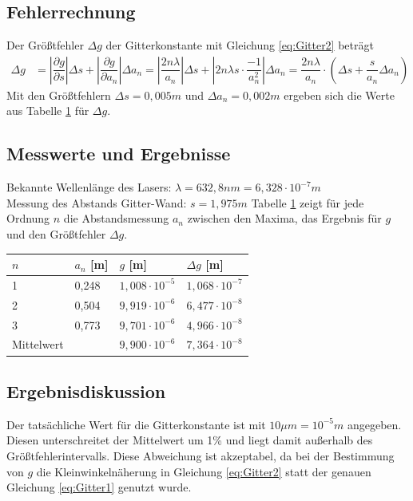 \documentclass{scrartcl}
\begin{document}
\subsection{Fehlerrechnung}
Der Größtfehler $\Delta g$ der Gitterkonstante mit Gleichung \ref{eq:Gitter2} beträgt
\begin{align*}
\Delta g & = \left| \dfrac{\partial g}{\partial s} \right| \Delta s + \left| \dfrac{\partial g}{\partial a_{n}} \right| \Delta a_{n} = \left| \dfrac{2n \lambda}{a_{n}} \right| \Delta s + \left| 2n \lambda s \cdot \dfrac{-1}{a_{n}^{2}} \right| \Delta a_{n} = \dfrac{2n \lambda}{a_{n}} \cdot \left( \Delta s + \dfrac{s}{a_{n}} \Delta a_{n} \right)
\end{align*}
Mit den Größtfehlern $\Delta s = 0,005m$ und $\Delta a_{n} = 0,002m$ ergeben sich  die Werte aus Tabelle \ref{tab:Gitter} für $\Delta g$.
\subsection{Messwerte und Ergebnisse}
Bekannte Wellenlänge des Lasers: $\lambda = 632,8nm = 6,328 \cdot 10^{-7}m$ \\
Messung des Abstands Gitter-Wand: $s = 1,975m$
Tabelle \ref{tab:Gitter} zeigt für jede Ordnung $n$ die Abstandsmessung $a_{n}$ zwischen den Maxima, das Ergebnis für $g$ und den Größtfehler $\Delta g$.
\begin{table}[H]
\begin{center}
\begin{tabular}{l|l|l|l}
$n$    & $a_{n}$ {[}m{]} & $g$ {[}m{]} & $\Delta g$ {[}m{]}\\
\hline
1          & 0,248       & $1,008 \cdot 10^{-5}$ & $1,068 \cdot 10^{-7}$ \\
2          & 0,504       & $9,919 \cdot 10^{-6}$ & $6,477 \cdot 10^{-8}$ \\
3          & 0,773       & $9,701 \cdot 10^{-6}$ & $4,966 \cdot 10^{-8}$ \\
\hline
Mittelwert &             & $9,900 \cdot 10^{-6}$ & $7,364 \cdot 10^{-8}$
\end{tabular}
\end{center}
\label{tab:Gitter}
\end{table}

\subsection{Ergebnisdiskussion}
Der tatsächliche Wert für die Gitterkonstante ist mit $10 \mu m = 10^{-5} m$ angegeben. Diesen unterschreitet der Mittelwert um 1\% und liegt damit außerhalb des Größtfehlerintervalls. Diese Abweichung ist akzeptabel, da bei der Bestimmung von $g$ die Kleinwinkelnäherung in Gleichung \ref{eq:Gitter2} statt der genauen Gleichung \ref{eq:Gitter1} genutzt wurde.
\end{document}
